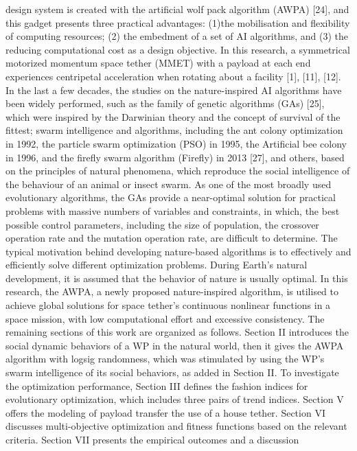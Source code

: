 \documentclass[conference]{IEEEtran}
\begin{document}
design system is created with the artificial wolf pack algorithm (AWPA) [24], and this gadget presents three practical
advantages: (1)the mobilisation and flexibility of computing
resources; (2) the embedment of a set of AI algorithms,
and (3) the reducing computational cost as a design objective. In this research, a symmetrical motorized momentum space tether (MMET) with a payload at each end
experiences centripetal acceleration when rotating about a
facility [1], [11], [12].
In the last a few decades, the studies on the nature-inspired
AI algorithms have been widely performed, such as the family of genetic algorithms (GAs) [25], which were inspired
by the Darwinian theory and the concept of survival of the
fittest; swarm intelligence and algorithms, including the ant
colony optimization in 1992, the particle swarm optimization (PSO) in 1995, the Artificial bee colony in 1996, and
the firefly swarm algorithm (Firefly) in 2013 [27], and others, based on the principles of natural phenomena, which
reproduce the social intelligence of the behaviour of an
animal or insect swarm. As one of the most broadly used
evolutionary algorithms, the GAs provide a near-optimal
solution for practical problems with massive numbers of
variables and constraints, in which, the best possible control
parameters, including the size of population, the crossover
operation rate and the mutation operation rate, are difficult to determine. The typical motivation behind developing nature-based algorithms is to effectively and efficiently
solve different optimization problems. During Earth’s natural
development, it is assumed that the behavior of nature is
usually optimal. In this research, the AWPA, a newly proposed nature-inspired algorithm, is utilised to achieve global
solutions for space tether’s continuous nonlinear functions in
a space mission, with low computational effort and excessive
consistency.
The remaining sections of this work are organized as
follows. Section II introduces the social dynamic behaviors of a WP in the natural world, then it gives the AWPA
algorithm with logsig randomness, which was stimulated by
using the WP’s swarm intelligence of its social behaviors,
as added in Section II. To investigate the optimization performance, Section III defines the fashion indices for evolutionary optimization, which includes three pairs of trend indices.
Section V offers the modeling of payload transfer the use
of a house tether. Section VI discusses multi-objective optimization and fitness functions based on the relevant criteria.
Section VII presents the empirical outcomes and a discussion 
\end{document}
